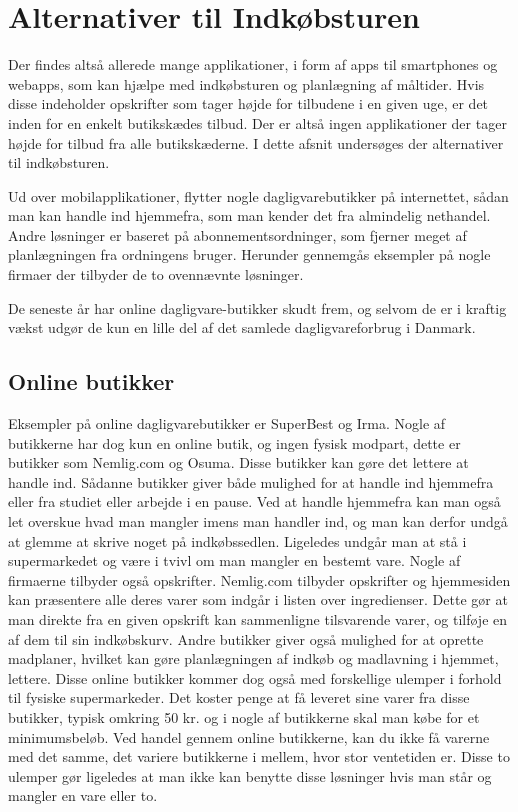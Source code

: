 \section{Alternativer til Indkøbsturen}
Der findes altså allerede mange applikationer, i form af apps til smartphones og webapps, som kan hjælpe med indkøbsturen og planlægning af måltider. Hvis disse indeholder opskrifter som tager højde for tilbudene i en given uge, er det inden for en enkelt butikskædes tilbud. Der er altså ingen applikationer der tager højde for tilbud fra alle butikskæderne. I dette afsnit undersøges der alternativer til indkøbsturen.

Ud over mobilapplikationer, flytter nogle dagligvarebutikker på internettet, sådan man kan handle ind hjemmefra, som man kender det fra almindelig nethandel.
Andre løsninger er baseret på abonnementsordninger, som fjerner meget af planlægningen fra ordningens bruger.
Herunder gennemgås eksempler på nogle firmaer der tilbyder de to ovennævnte løsninger.

De seneste år har online dagligvare-butikker skudt frem, og selvom de er i kraftig vækst udgør de kun en lille del af det samlede dagligvareforbrug i Danmark\citep{SOTA_MP1}.

\subsection{Online butikker}
Eksempler på online dagligvarebutikker er SuperBest og Irma\citep{SOTA_MP_SB, SOTA_MP_IRMA}.
Nogle af butikkerne har dog kun en online butik, og ingen fysisk modpart, dette er butikker som Nemlig.com og Osuma\citep{SOTA_MP_NEMLIG, SOTA_MP_OSUMA}.
Disse butikker kan gøre det lettere at handle ind.
Sådanne butikker giver både mulighed for at handle ind hjemmefra eller fra studiet eller arbejde i en pause.
Ved at handle hjemmefra kan man også let overskue hvad man mangler imens man handler ind, og man kan derfor undgå at glemme at skrive noget på indkøbssedlen.
Ligeledes undgår man at stå i supermarkedet og være i tvivl om man mangler en bestemt vare.
Nogle af firmaerne tilbyder også opskrifter.
Nemlig.com tilbyder opskrifter og hjemmesiden kan præsentere alle deres varer som indgår i listen over ingredienser.
Dette gør at man direkte fra en given opskrift kan sammenligne tilsvarende varer, og tilføje en af dem til sin indkøbskurv.
Andre butikker giver også mulighed for at oprette madplaner, hvilket kan gøre planlægningen af indkøb og madlavning i hjemmet, lettere.
Disse online butikker kommer dog også med forskellige ulemper i forhold til fysiske supermarkeder.
Det koster penge at få leveret sine varer fra disse butikker, typisk omkring 50 kr. og i nogle af butikkerne skal man købe for et minimumsbeløb.
Ved handel gennem online butikkerne, kan du ikke få varerne med det samme, det variere butikkerne i mellem, hvor stor ventetiden er.
Disse to ulemper gør ligeledes at man ikke kan benytte disse løsninger hvis man står og mangler en vare eller to. 


